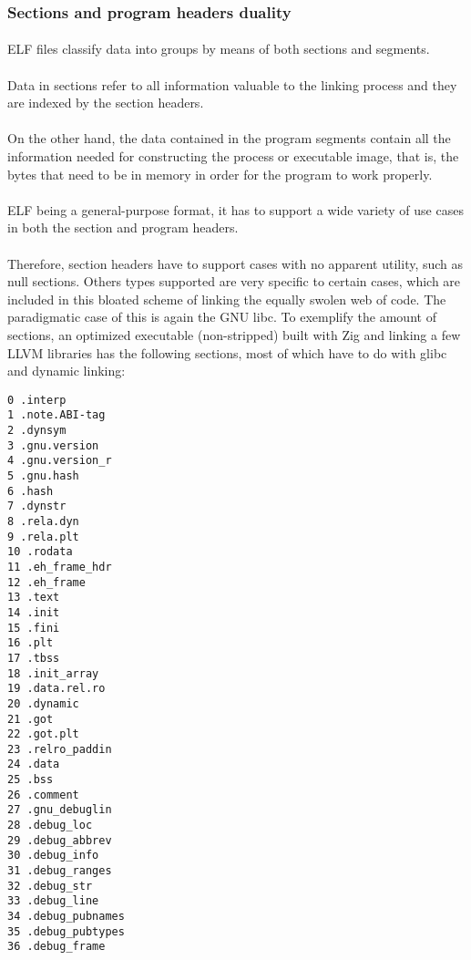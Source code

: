 \documentclass[12pt]{article}
\begin{document}
	\subsubsection{Sections and program headers duality}
	
	\paragraph{}ELF files classify data into groups by means of both sections and segments. \paragraph{}Data in sections refer to all information valuable to the linking process and they are indexed by the section headers.
	\paragraph{}On the other hand, the data contained in the program segments contain all the information needed for constructing the process or executable image, that is, the bytes that need to be in memory in order for the program to work properly.
	\paragraph{}ELF being a general-purpose format, it has to support a wide variety of use cases in both the section and program headers.
	\paragraph{}Therefore, section headers have to support cases with no apparent utility, such as null sections. Others types supported are very specific to certain cases, which are included in this bloated scheme of linking the equally swolen web of code. The paradigmatic case of this is again the GNU libc. To exemplify the amount of sections, an optimized executable (non-stripped) built with Zig and linking a few LLVM libraries has the following sections, most of which have to do with glibc and dynamic linking\cite{nativity}:
	\begin{verbatim}
0 .interp
1 .note.ABI-tag
2 .dynsym
3 .gnu.version 
4 .gnu.version_r
5 .gnu.hash
6 .hash
7 .dynstr
8 .rela.dyn
9 .rela.plt
10 .rodata
11 .eh_frame_hdr
12 .eh_frame
13 .text
14 .init
15 .fini
16 .plt
17 .tbss
18 .init_array
19 .data.rel.ro 
20 .dynamic
21 .got
22 .got.plt
23 .relro_paddin
24 .data
25 .bss
26 .comment
27 .gnu_debuglin
28 .debug_loc
29 .debug_abbrev
30 .debug_info
31 .debug_ranges
32 .debug_str
33 .debug_line
34 .debug_pubnames
35 .debug_pubtypes
36 .debug_frame		
	\end{verbatim}
	
\end{document}
